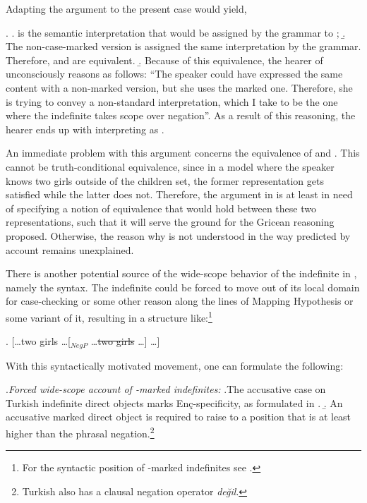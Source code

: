\documentclass[11pt,a4paper]{article}
\newcommand{\encspec}{Enç-specific}
\begin{document}
Adapting the argument to the present case would yield,

\ex.\label{encgrice}
\a.  is the semantic interpretation that
would be assigned by the grammar to ;
\b. The non-case-marked version is assigned the same interpretation by
the grammar. Therefore,   and
 are equivalent.
\b. Because of this equivalence, the hearer of 
unconsciously reasons as follows: ``The speaker could have expressed
the same content with a non-marked version, but she uses the marked
one. Therefore, she is trying to convey a non-standard interpretation,
which I take to be the one where the indefinite takes scope over
negation''. As a result of this reasoning, the hearer ends up with
interpreting  as .


An immediate problem with this argument concerns the equivalence of
 and . This cannot be
truth-conditional equivalence, since in a model where the speaker
knows two girls outside of the children set, the former representation
gets satisfied while the latter does not. Therefore, the argument in
 is at least in need of specifying a notion of
equivalence that would hold between these two representations, such
that it will serve the ground for the Gricean reasoning proposed.
Otherwise, the reason why  is not understood in the
way predicted by  account remains unexplained.

There is another potential source of the wide-scope behavior of the
indefinite in , namely the syntax. The indefinite
could be forced to move out of its local domain for case-checking or
some other reason along the lines of  Mapping
Hypothesis or some variant of it, resulting in a structure
like:\footnote{For the syntactic position of \acc-marked indefinites
see .}

\ex. [\ldots two girls \ldots [$_{NegP}$ \ldots \sout{two girls} \ldots ] \ldots]


With this syntactically motivated movement, one can formulate
the following:

\ex.\label{wsa}{\it Forced wide-scope account of \acc-marked
indefinites:}
\a.\label{wsaa}The accusative case on Turkish indefinite direct objects marks
\encspec{ity}, as formulated in . 
\b.\label{wsab}  An accusative marked direct object is required to raise to a
position that is at least higher than the phrasal
negation.\footnote{Turkish also has a clausal negation operator 
 \textit{değil}.}
\end{document}
